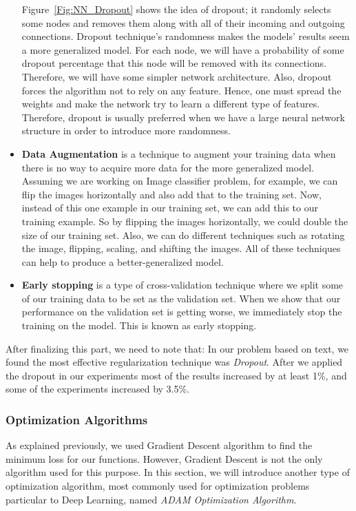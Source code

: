 \begin{itemize}
Figure~\ref{Fig:NN_Dropout} shows the idea of dropout; it randomly selects some nodes and removes them along with all of their incoming and outgoing connections. Dropout technique’s randomness makes the models’ results seem a more generalized model. For each node, we will have a probability of some dropout percentage that this node will be removed with its connections. Therefore, we will have some simpler network architecture. Also, dropout forces the algorithm not to rely on any feature. Hence, one must spread the weights and make the network try to learn a different type of features. Therefore, dropout is usually preferred when we have a large neural network structure in order to introduce more randomness.

\item \textbf{Data Augmentation} is a technique to augment your training data when there is no way to acquire more data for the more generalized model. Assuming we are working on Image classifier problem, for example, we can flip the images horizontally and also add that to the training set. Now, instead of this one example in our training set, we can add this to our training example. So by flipping the images horizontally, we could double the size of our training set. Also, we can do different techniques such as rotating the image, flipping, scaling, and shifting the images. All of these techniques can help to produce a better-generalized model.

\item \textbf{Early stopping} is a type of cross-validation technique where we split some of our training data to be set as the validation set. When we show that our performance on the validation set is getting worse, we immediately stop the training on the model. This is known as early stopping.%

\end{itemize}

After finalizing this part, we need to note that: In our problem based on text, we found the most effective regularization technique was \textit{Dropout}. After we applied the dropout in our experiments most of the results increased by at least 1\%, and some of the experiments increased by 3.5\%.

\subsubsection{Optimization Algorithms}
As explained previously, we used Gradient Descent algorithm to find the minimum loss for our functions. However, Gradient Descent is not the only algorithm used for this purpose. In this section, we will introduce another type of optimization algorithm, most commonly used for optimization problems particular to Deep Learning, named \textit{ADAM Optimization Algorithm}.

